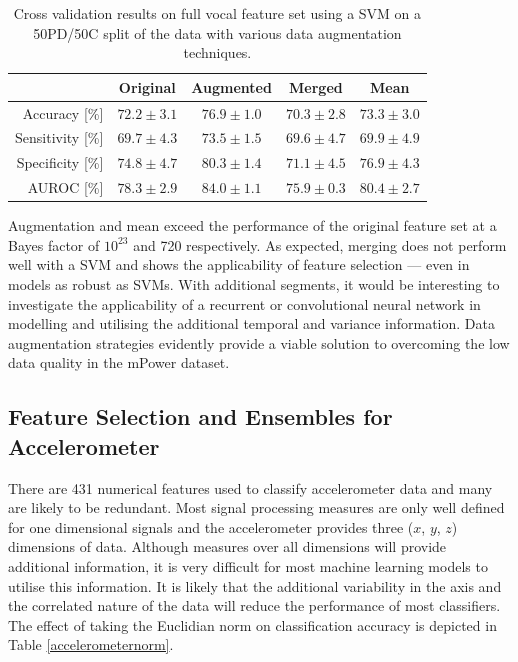 \documentclass[12pt, twoside]{book}
\begin{document}
\begin{table}[h]
	\caption{Cross validation results on full vocal feature set using a SVM on a 50PD/50C split of the data with various data augmentation techniques.}
	\label{speechboost}
	\centering
	\begin{tabular}{@{}rcccc@{}}
		&  Original & Augmented & Merged & Mean \\ \midrule
		Accuracy [\%]    &      $72.2\pm3.1$ &                       $76.9\pm1.0$                                  &     		$70.3\pm2.8$
		&						$73.3\pm3.0$\\ \midrule
		Sensitivity [\%] &       $69.7\pm4.3$ &                       $73.5\pm1.5$                                  &    		$69.6\pm4.7$
		&					    $69.9\pm4.9$\\ \midrule
		Specificity [\%] &      $74.8\pm4.7$ &                       $80.3\pm1.4$                                  &    		$71.1\pm4.5$
		&					    $76.9\pm4.3$\\ \midrule
		AUROC [\%]         &      $78.3\pm2.9$ &                       $84.0\pm1.1$                                  &     		$75.9\pm0.3$
		&				 		$80.4\pm2.7$\\ \midrule
	\end{tabular}
\end{table}

Augmentation and mean exceed the performance of the original feature set at a Bayes factor of $10^{23}$ and 720 respectively. As expected, merging does not perform well with a SVM and shows the applicability of feature selection --- even in models as robust as SVMs. With additional segments, it would be interesting to investigate the applicability of a recurrent or convolutional neural network in modelling and utilising the additional temporal and variance information. Data augmentation strategies evidently provide a viable solution to overcoming the low data quality in the mPower dataset. 



\subsection{Feature Selection and Ensembles for Accelerometer}
There are 431 numerical features used to classify accelerometer data and many are likely to be redundant. Most signal processing measures are only well defined for one dimensional signals and the accelerometer provides three ($x$, $y$, $z$) dimensions of data. Although measures over all dimensions will provide additional information, it is very difficult for most machine learning models to utilise this information. It is likely that the additional variability in the axis and the correlated nature of the data will reduce the performance of most classifiers. The effect of taking the Euclidian norm on classification accuracy is depicted in Table \ref{accelerometernorm}.
\end{document}
